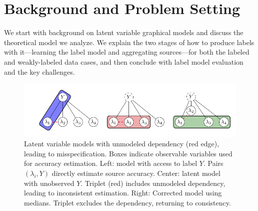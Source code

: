 \section{Background and Problem Setting} \label{sec:background}

We start with background on latent variable graphical models and discuss the theoretical model we analyze. We explain the two stages of how to produce labels with it---learning the label model and aggregating sources---for both the labeled and weakly-labeled data cases, and then conclude with label model evaluation and the key challenges.


\begin{figure}
    \centering
    \includegraphics[width=.7\textwidth]{figures/models.pdf}
    \caption{Latent variable models with unmodeled dependency (red edge), leading to misspecification. Boxes indicate observable variables used for accuracy estimation. Left: model with access to label $Y$. Pairs $(\lambda_i, Y)$ directly estimate source accuracy. Center: latent model with unobserved $Y$. Triplet (red) includes unmodeled dependency, leading to inconsistent estimation. Right: Corrected model using medians. Triplet excludes the dependency, returning to consistency.}
    \label{fig:biases}
\end{figure}




